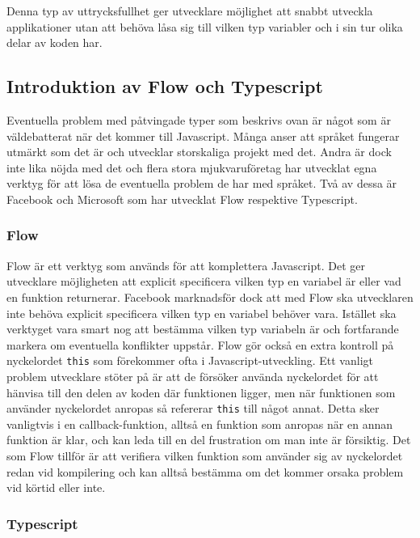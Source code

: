 Denna typ av uttrycksfullhet ger utvecklare möjlighet att snabbt utveckla applikationer utan att behöva låsa sig till vilken typ variabler och i sin tur olika delar av koden har.


\subsection{Introduktion av Flow och Typescript}

Eventuella problem med påtvingade typer som beskrivs ovan är något som är väldebatterat när det kommer till Javascript. Många anser att språket fungerar utmärkt som det är och utvecklar storskaliga projekt med det. Andra är dock inte lika nöjda med det\cite{js-bad} och flera stora mjukvaruföretag har utvecklat egna verktyg för att lösa de eventuella problem de har med språket. Två av dessa är Facebook och Microsoft som har utvecklat Flow\cite{info-flow} respektive Typescript\cite{typescript}.

\subsubsection{Flow}

Flow är ett verktyg som används för att komplettera Javascript. Det ger utvecklare möjligheten att explicit specificera vilken typ en variabel är eller vad en funktion returnerar. Facebook marknadsför dock att med Flow ska utvecklaren inte behöva explicit specificera vilken typ en variabel behöver vara. Istället ska verktyget vara smart nog att bestämma vilken typ variabeln är och fortfarande markera om eventuella konflikter uppstår. Flow gör också en extra kontroll på nyckelordet \texttt{this} som förekommer ofta i Javascript-utveckling. Ett vanligt problem utvecklare stöter på är att de försöker använda nyckelordet för att hänvisa till den delen av koden där funktionen ligger, men när funktionen som använder nyckelordet anropas så refererar \texttt{this} till något annat. Detta sker vanligtvis i en callback-funktion, alltså en funktion som anropas när en annan funktion är klar, och kan leda till en del frustration om man inte är försiktig. Det som Flow tillför är att verifiera vilken funktion som använder sig av nyckelordet redan vid kompilering och kan alltså bestämma om det kommer orsaka problem vid körtid eller inte. 

\subsubsection{Typescript}

